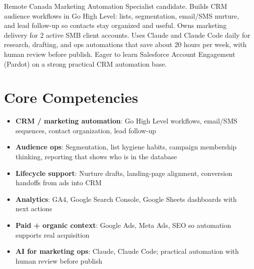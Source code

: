 \documentclass[11pt,a4paper,sans]{moderncv}
\begin{document}
\makecvtitle

\vspace{6pt}
\small{Remote Canada Marketing Automation Specialist candidate. Builds CRM audience workflows in Go High Level: lists, segmentation, email/SMS nurture, and lead follow-up so contacts stay organized and useful. Owns marketing delivery for 2 active SMB client accounts. Uses Claude and Claude Code daily for research, drafting, and ops automations that save about 20 hours per week, with human review before publish. Eager to learn Salesforce Account Engagement (Pardot) on a strong practical CRM automation base.}

\section{Core Competencies}
\vspace{1pt}
\begin{itemize}
\item \textbf{CRM / marketing automation}: Go High Level workflows, email/SMS sequences, contact organization, lead follow-up
\item \textbf{Audience ops}: Segmentation, list hygiene habits, campaign membership thinking, reporting that shows who is in the database
\item \textbf{Lifecycle support}: Nurture drafts, landing-page alignment, conversion handoffs from ads into CRM
\item \textbf{Analytics}: GA4, Google Search Console, Google Sheets dashboards with next actions
\item \textbf{Paid + organic context}: Google Ads, Meta Ads, SEO so automation supports real acquisition
\item \textbf{AI for marketing ops}: Claude, Claude Code; practical automation with human review before publish
\end{itemize}
\end{document}
